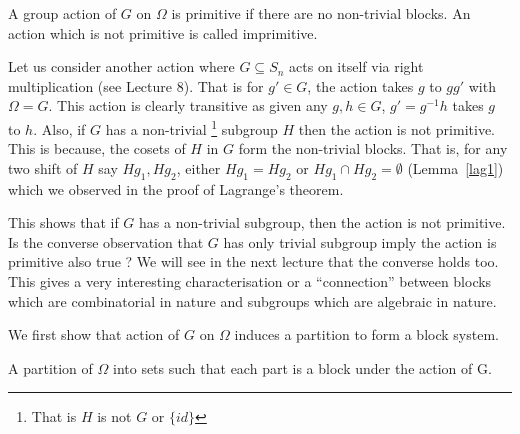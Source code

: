 \begin{definition}
	A group action of $G$ on $\Omega$ is primitive if there are no
	non-trivial blocks. An action which is not primitive is called
	imprimitive.
\end{definition}

Let us consider another action where $G \subseteq S_n$ acts on itself via
right multiplication (see Lecture 8). That is for $g' \in G$, the action
takes $g$ to $gg'$ with $\Omega = G$. This action is clearly transitive as
given any $g,h \in G$, $g' = g^{-1}h$ takes $g$ to $h$. Also, if $G$ has a 
non-trivial \footnote{That is $H$ is not $G$ or $\{id\}$} subgroup $H$ then
the action is not primitive.  This is because, the cosets of $H$ in $G$ form 
the non-trivial blocks. That is, for any two shift of $H$ say $Hg_1, Hg_2$,
either $Hg_1 = Hg_2$ or $Hg_1 \cap Hg_2 = \emptyset$ (Lemma~\ref{lag1}) which
we observed in the proof of Lagrange's theorem.

This shows that if $G$ has a non-trivial subgroup, then the action is not
primitive. Is the converse observation that $G$ has only trivial
subgroup imply the action is primitive also true ? We will see in the next 
lecture that the converse holds too. This gives a very interesting
characterisation or a ``connection'' between blocks which are combinatorial in
nature and subgroups which are algebraic in nature.

We first show that action of $G$ on $\Omega$ induces a partition to form a
block system.

\begin{definition}
A partition of $\Omega$ into sets such that each part is a block under the action of G.
\end{definition}

